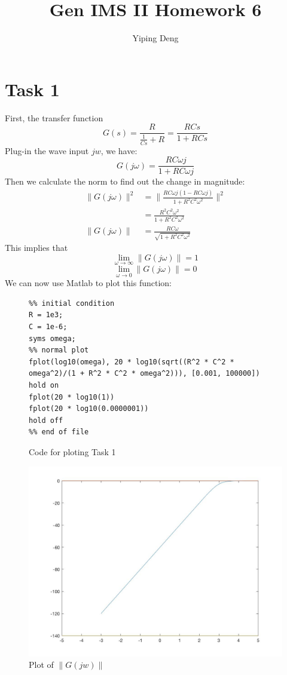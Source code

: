 \documentclass{article}
\newcommand{\hwnumber}{6}
\begin{document}
\title{Gen IMS II Homework \hwnumber}
\author{Yiping Deng}
\maketitle
\thispagestyle{fancy}
\section*{Task 1}
First, the transfer function
$$G(s) = \frac{R}{\frac{1}{C s} + R} = \frac{R C s}{1 + R C s}$$
Plug-in the wave input $j w$, we have:
$$G(j \omega) = \frac{R C \omega j}{1 + R C \omega j}$$
Then we calculate the norm to find out the change in magnitude:
\begin{align*}
    \| G(j \omega) \|^2 &= \| \frac{R C \omega j(1 - R C \omega j)}{1 + R^2 C^2 \omega^2} \|^2\\
    &= \frac{R^2 C^2 \omega^2}{1 + R^2 C^2 \omega^2} \\
	\| G(j \omega) \| &= \frac{R C \omega}{\sqrt{1 + R^2 C^2 \omega^2}}
\end{align*}
This implies that
$$\lim_{\omega \to \infty} \|G(j \omega)\| = 1$$
$$\lim_{\omega \to 0} \|G(j \omega)\| = 0$$
We can now use Matlab to plot this function:
\begin{figure}
\begin{verbatim}
%% initial condition
R = 1e3;
C = 1e-6;
syms omega;
%% normal plot
fplot(log10(omega), 20 * log10(sqrt((R^2 * C^2 * omega^2)/(1 + R^2 * C^2 * omega^2))), [0.001, 100000])
hold on
fplot(20 * log10(1))
fplot(20 * log10(0.0000001))
hold off
%% end of file
\end{verbatim}
    \caption{Code for ploting Task 1}
\end{figure}
\begin{figure}[H]
    \centering
    \includegraphics[width=\textwidth]{task1.jpg}
    \caption{Plot of $\| G(jw) \|$}
\end{figure}
\end{document}

